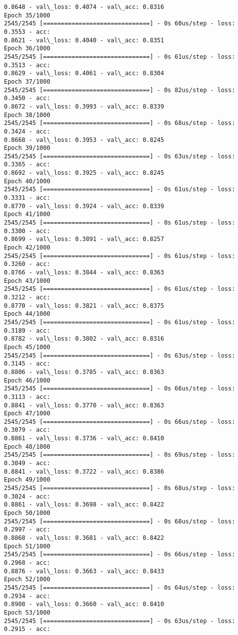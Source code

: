 \documentclass[11pt]{article}
\begin{document}
\begin{Verbatim}[commandchars=\\\{\}]
0.8648 - val\_loss: 0.4074 - val\_acc: 0.8316
Epoch 35/1000
2545/2545 [==============================] - 0s 60us/step - loss: 0.3553 - acc:
0.8621 - val\_loss: 0.4040 - val\_acc: 0.8351
Epoch 36/1000
2545/2545 [==============================] - 0s 61us/step - loss: 0.3513 - acc:
0.8629 - val\_loss: 0.4061 - val\_acc: 0.8304
Epoch 37/1000
2545/2545 [==============================] - 0s 82us/step - loss: 0.3450 - acc:
0.8672 - val\_loss: 0.3993 - val\_acc: 0.8339
Epoch 38/1000
2545/2545 [==============================] - 0s 68us/step - loss: 0.3424 - acc:
0.8668 - val\_loss: 0.3953 - val\_acc: 0.8245
Epoch 39/1000
2545/2545 [==============================] - 0s 63us/step - loss: 0.3365 - acc:
0.8692 - val\_loss: 0.3925 - val\_acc: 0.8245
Epoch 40/1000
2545/2545 [==============================] - 0s 61us/step - loss: 0.3331 - acc:
0.8770 - val\_loss: 0.3924 - val\_acc: 0.8339
Epoch 41/1000
2545/2545 [==============================] - 0s 61us/step - loss: 0.3300 - acc:
0.8699 - val\_loss: 0.3891 - val\_acc: 0.8257
Epoch 42/1000
2545/2545 [==============================] - 0s 61us/step - loss: 0.3260 - acc:
0.8766 - val\_loss: 0.3844 - val\_acc: 0.8363
Epoch 43/1000
2545/2545 [==============================] - 0s 61us/step - loss: 0.3212 - acc:
0.8770 - val\_loss: 0.3821 - val\_acc: 0.8375
Epoch 44/1000
2545/2545 [==============================] - 0s 61us/step - loss: 0.3189 - acc:
0.8782 - val\_loss: 0.3802 - val\_acc: 0.8316
Epoch 45/1000
2545/2545 [==============================] - 0s 63us/step - loss: 0.3145 - acc:
0.8806 - val\_loss: 0.3785 - val\_acc: 0.8363
Epoch 46/1000
2545/2545 [==============================] - 0s 66us/step - loss: 0.3113 - acc:
0.8841 - val\_loss: 0.3770 - val\_acc: 0.8363
Epoch 47/1000
2545/2545 [==============================] - 0s 66us/step - loss: 0.3079 - acc:
0.8861 - val\_loss: 0.3736 - val\_acc: 0.8410
Epoch 48/1000
2545/2545 [==============================] - 0s 69us/step - loss: 0.3049 - acc:
0.8841 - val\_loss: 0.3722 - val\_acc: 0.8386
Epoch 49/1000
2545/2545 [==============================] - 0s 68us/step - loss: 0.3024 - acc:
0.8861 - val\_loss: 0.3698 - val\_acc: 0.8422
Epoch 50/1000
2545/2545 [==============================] - 0s 68us/step - loss: 0.2997 - acc:
0.8868 - val\_loss: 0.3681 - val\_acc: 0.8422
Epoch 51/1000
2545/2545 [==============================] - 0s 66us/step - loss: 0.2968 - acc:
0.8876 - val\_loss: 0.3663 - val\_acc: 0.8433
Epoch 52/1000
2545/2545 [==============================] - 0s 64us/step - loss: 0.2934 - acc:
0.8908 - val\_loss: 0.3660 - val\_acc: 0.8410
Epoch 53/1000
2545/2545 [==============================] - 0s 63us/step - loss: 0.2915 - acc:

\end{Verbatim}
\end{document}

